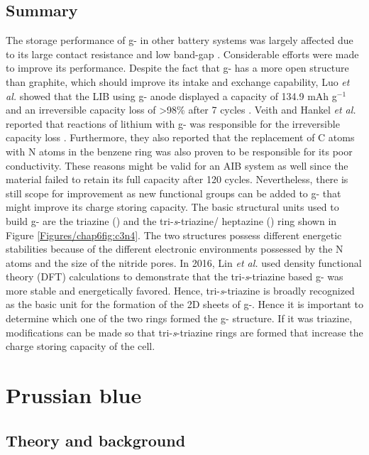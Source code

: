\subsection{Summary}
The storage performance of g- in other battery systems was largely affected due to its large contact resistance and low band-gap \cite{shah_highly_2017}. Considerable efforts were made to improve its performance. Despite the fact that g- has a more open structure than graphite, which should improve its  intake and exchange capability, Luo \textit{et al.} showed that the LIB using g- anode displayed a capacity of 134.9 mAh g$^{-1}$ and an irreversible capacity loss of >98\% after 7 cycles \cite{luo_graphitic_2019}. Veith and Hankel \textit{et al.} reported that reactions of lithium with g- was responsible for the irreversible capacity loss \cite{veith_electrochemical_2013, hankel_lithium_2015}. Furthermore, they also reported that the replacement of C atoms with N atoms in the benzene ring was also proven to be responsible for its poor conductivity. These reasons might be valid for an AIB system as well since the material failed to retain its full capacity after 120 cycles. Nevertheless, there is still scope for improvement as new functional groups can be added to g- that might improve its charge storing capacity. The basic structural units used to build g- are the triazine () and the tri-\textit{s}-triazine/ heptazine () ring shown in Figure \ref{Figures/chap6fig:c3n4}. The two structures possess different energetic stabilities because of the different electronic environments possessed by the N atoms and the size of the nitride pores. In 2016, Lin \textit{et al.} used density functional theory (DFT) calculations to demonstrate that the tri-\textit{s}-triazine based g- was more stable and energetically favored. Hence, tri-\textit{s}-triazine is broadly recognized as the basic unit for the formation of the 2D sheets of g-. Hence it is important to determine which one of the two rings formed the g- structure. If it was triazine, modifications can be made so that tri-\textit{s}-triazine rings are formed that increase the charge storing capacity of the cell. 

\section{Prussian blue}

\subsection{Theory and background}

